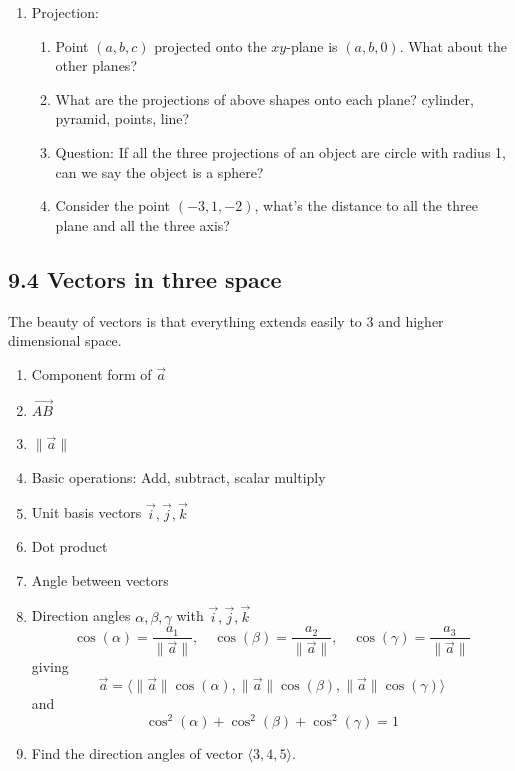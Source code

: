 \documentclass{article}
\begin{document}
\begin{enumerate}
\item Projection: 
\begin{enumerate}
\item Point $(a,b,c)$ projected onto the $xy$-plane is $(a,b,0)$. What about the other planes? 
\item What are the projections of above shapes onto each plane? cylinder, pyramid, points, line?
\item Question: If all the three projections of an object are circle with radius 1, can we say the object is a sphere?
\item Consider the point $(-3,1,-2)$, what's the distance to all the three plane and all the three axis?
\end{enumerate}
\end{enumerate}


\subsection{9.4 Vectors in three space}

The beauty of vectors is that everything extends easily to 3 and higher dimensional space.

\begin{enumerate}
\item Component form of $\vec{a}$
\item $\vec{AB}$
\item $\| \vec{a} \|$
\item Basic operations: Add, subtract, scalar multiply
\item Unit basis vectors $\vec{i}, \vec{j}, \vec{k}$
\item Dot product
\item Angle between vectors
\item Direction angles $\alpha, \beta, \gamma$ with $\vec{i}, \vec{j}, \vec{k}$
\[
\cos(\alpha) = \frac{a_1}{\| \vec{a} \|}, \quad \cos(\beta) = \frac{a_2}{\| \vec{a} \|}, \quad \cos(\gamma) = \frac{a_3}{\| \vec{a} \|}
\] 
giving 
\[
\vec{a} = \langle \| \vec{a} \| \cos(\alpha), \| \vec{a} \| \cos(\beta), \| \vec{a} \| \cos(\gamma) \rangle
\]
and
\[
\cos^2(\alpha) + \cos^2(\beta) + \cos^2(\gamma) = 1
\]
\item Find the direction angles of vector $\langle 3,4,5 \rangle$.
\end{enumerate}


\end{document}
